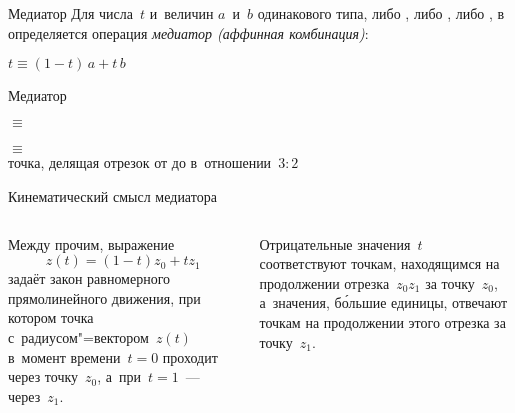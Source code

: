 \begin{frame}{Медиатор}
Для числа~$t$ и~величин $a$~и~$b$ одинакового типа, либо ,
либо , либо , в~ определяется
операция \emph{медиатор (аффинная комбинация)}:

\begin{center}
\LARGE $t$\quad$\equiv$\quad$(1-t)\,a+t\,b$
\end{center}
\end{frame}

\begin{frame}{Медиатор}
\begin{center}
\LARGE
{}\quad$\equiv$\quad{}\\[3ex]
\\
$\equiv$\\
{\normalsize точка, делящая отрезок от  до 
в~отношении~$3:2$}
\end{center}
\end{frame}

\begin{frame}{Кинематический смысл медиатора}
\begin{columns}
Между прочим, выражение
	\[
	z(t)=(1-t)z_0+tz_1
	\]
задаёт закон равномерного прямолинейного движения, при котором точка
с~радиусом"=вектором~$z(t)$ в~момент времени~$t=0$ проходит через точку~$z_0$,
а~при~$t=1$~— через~$z_1$.

\bigskip
Отрицательные значения~$t$ соответствуют точкам, находящимся на продолжении
отрезка~$z_0z_1$ за точку~$z_0$, а~значения, бо́льшие единицы, отвечают точкам
на продолжении этого отрезка за точку~$z_1$.
\end{columns}
\end{frame}
